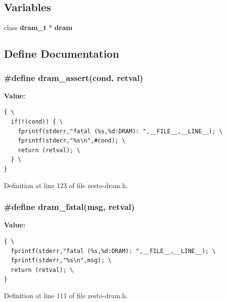 \subsection*{Variables}
\begin{CompactItemize}
\item 
class {\bf dram\_\-t} $\ast$ {\bf dram}
\end{CompactItemize}


\subsection{Define Documentation}
\subsubsection[{dram\_\-assert}]{\setlength{\rightskip}{0pt plus 5cm}\#define dram\_\-assert(cond, \/  retval)}\label{zesto-dram_8h_91e35a4fcf5f7aa1a31d5883efc0fc8e}


\textbf{Value:}

\begin{Code}\begin{verbatim}{ \
  if(!(cond)) { \
    fprintf(stderr,"fatal (%s,%d:DRAM): ",__FILE__,__LINE__); \
    fprintf(stderr,"%s\n",#cond); \
    return (retval); \
  } \
}
\end{verbatim}
\end{Code}


Definition at line 123 of file zesto-dram.h.
\subsubsection[{dram\_\-fatal}]{\setlength{\rightskip}{0pt plus 5cm}\#define dram\_\-fatal(msg, \/  retval)}\label{zesto-dram_8h_a901b0ec81388be39a5d166eba7bf944}


\textbf{Value:}

\begin{Code}\begin{verbatim}{ \
  fprintf(stderr,"fatal (%s,%d:DRAM): ",__FILE__,__LINE__); \
  fprintf(stderr,"%s\n",msg); \
  return (retval); \
}
\end{verbatim}
\end{Code}


Definition at line 111 of file zesto-dram.h.

